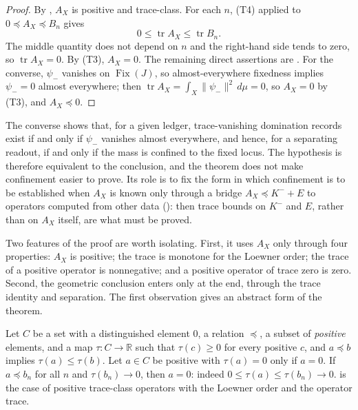 \documentclass[11pt]{article}
\DeclareMathOperator{\Fix}{Fix}
\DeclareMathOperator{\trace}{tr}
\newcommand{\psim}{\psi_{-}}
\newcommand{\AX}{A_{X}}
\newcommand{\Kminus}{K^{-}}
\theoremstyle{definition}
\begin{document}
\begin{proof}
By , \(\AX\) is positive
and trace-class.  For each \(n\), (T4) applied to
\(0\preceq\AX\preceq B_n\) gives
\[
  0\leq\trace\AX\leq\trace B_n .
\]
The middle quantity does not depend on \(n\) and the right-hand side
tends to zero, so \(\trace\AX=0\).  By (T3), \(\AX=0\).  The remaining
direct assertions are
.  For the
converse, \(\psim\) vanishes on \(\Fix(J)\), so almost-everywhere
fixedness implies \(\psim=0\) almost everywhere; then
\(\trace\AX=\int_X\|\psim\|^2\,d\mu=0\), so \(\AX=0\) by (T3), and
\(\AX\preceq0\).
\end{proof}

The converse shows that, for a given ledger, trace-vanishing domination
records exist if and only if \(\psim\) vanishes almost everywhere, and
hence, for a separating readout, if and only if the mass is confined to
the fixed locus.  The hypothesis is therefore equivalent to the
conclusion, and the theorem does not make confinement easier to prove.
Its role is to fix the form in which confinement is to be established
when \(\AX\) is known only through a bridge
\(\AX\preceq\Kminus+E\) to operators computed from other data
(): then trace bounds on \(\Kminus\) and \(E\),
rather than on \(\AX\) itself, are what must be proved.

Two features of the proof are worth isolating.  First, it uses \(\AX\)
only through four properties: \(\AX\) is positive; the trace is
monotone for the Loewner order; the trace of a positive operator is
nonnegative; and a positive operator of trace zero is zero.  Second,
the geometric conclusion enters only at the end, through the trace
identity and separation.  The first observation gives an abstract form
of the theorem.

\begin{remark}
\label{rem:duality_confinement:abstract-cone}
Let \(C\) be a set with a distinguished element \(0\), a relation
\(\preceq\), a subset of \emph{positive} elements, and a map
\(\tau:C\to\mathbb R\) such that \(\tau(c)\geq0\) for every positive
\(c\), and \(a\preceq b\) implies \(\tau(a)\leq\tau(b)\).
Let \(a\in C\) be positive with \(\tau(a)=0\) only if \(a=0\).  If
\(a\preceq b_n\) for all \(n\) and \(\tau(b_n)\to0\), then \(a=0\): indeed \(0\leq\tau(a)\leq\tau(b_n)\to0\).   is
the case of positive trace-class operators with the Loewner order and
the operator trace.
\end{remark}
\end{document}
